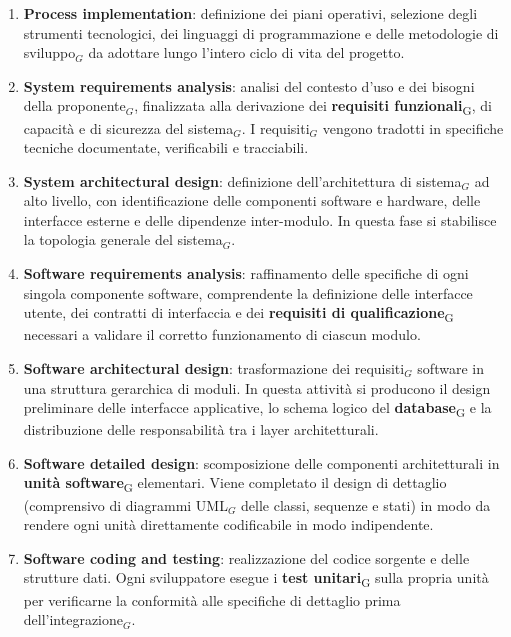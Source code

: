 \documentclass[a4paper, 10pt]{article}
\begin{document}
\begin{enumerate}
    \item \textbf{Process implementation}: definizione dei piani operativi, selezione degli strumenti tecnologici, dei linguaggi di programmazione e delle metodologie di sviluppo$_G$ da adottare lungo l'intero ciclo di vita del progetto.

    \item \textbf{System requirements analysis}: analisi del contesto d'uso e dei bisogni della proponente$_G$, finalizzata alla derivazione dei \textbf{requisiti funzionali}\textsubscript{G}, di capacità e di sicurezza del sistema$_G$. I requisiti$_G$ vengono tradotti in specifiche tecniche documentate, verificabili e tracciabili.

    \item \textbf{System architectural design}: definizione dell'architettura di sistema$_G$ ad alto livello, con identificazione delle componenti software e hardware, delle interfacce esterne e delle dipendenze inter-modulo. In questa fase si stabilisce la topologia generale del sistema$_G$.

    \item \textbf{Software requirements analysis}: raffinamento delle specifiche di ogni singola componente software, comprendente la definizione delle interfacce utente, dei contratti di interfaccia e dei \textbf{requisiti di qualificazione}\textsubscript{G} necessari a validare il corretto funzionamento di ciascun modulo.

    \item \textbf{Software architectural design}: trasformazione dei requisiti$_G$ software in una struttura gerarchica di moduli. In questa attività si producono il design preliminare delle interfacce applicative, lo schema logico del \textbf{database}\textsubscript{G} e la distribuzione delle responsabilità tra i layer architetturali.

    \item \textbf{Software detailed design}: scomposizione delle componenti architetturali in \textbf{unità software}\textsubscript{G} elementari. Viene completato il design di dettaglio (comprensivo di diagrammi UML$_G$ delle classi, sequenze e stati) in modo da rendere ogni unità direttamente codificabile in modo indipendente.

    \item \textbf{Software coding and testing}: realizzazione del codice sorgente e delle strutture dati. Ogni sviluppatore esegue i \textbf{test unitari}\textsubscript{G} sulla propria unità per verificarne la conformità alle specifiche di dettaglio prima dell'integrazione$_G$.


\end{enumerate}
\end{document}
